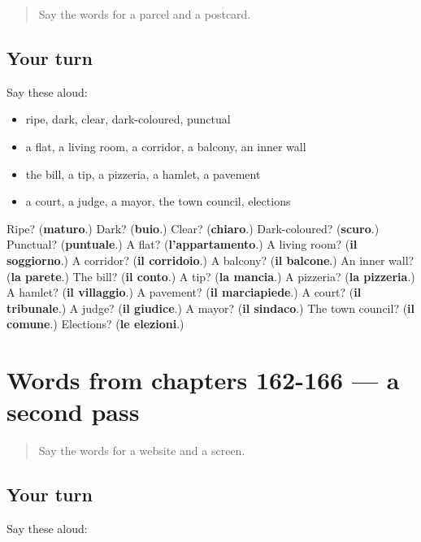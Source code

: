 \label{lesson:IT-R166-first-pass-words-from-chapters-158-161}



\begin{quote}
Say the words for a parcel and a postcard.
\end{quote}

\subsection*{Your turn}
Say these aloud:

\begin{itemize}
\raggedright
  \item ripe, dark, clear, dark-coloured, punctual
  \item a flat, a living room, a corridor, a balcony, an inner wall
  \item the bill, a tip, a pizzeria, a hamlet, a pavement
  \item a court, a judge, a mayor, the town council, elections
\end{itemize}

\begin{tcolorbox}[breakable,colback=teal!4,colframe=teal!35!black,title={Before you move on}]
Ripe? (\textbf{maturo}.) Dark? (\textbf{buio}.) Clear? (\textbf{chiaro}.) Dark-coloured? (\textbf{scuro}.) Punctual? (\textbf{puntuale}.) A flat? (\textbf{l'appartamento}.) A living room? (\textbf{il soggiorno}.) A corridor? (\textbf{il corridoio}.) A balcony? (\textbf{il balcone}.) An inner wall? (\textbf{la parete}.) The bill? (\textbf{il conto}.) A tip? (\textbf{la mancia}.) A pizzeria? (\textbf{la pizzeria}.) A hamlet? (\textbf{il villaggio}.) A pavement? (\textbf{il marciapiede}.) A court? (\textbf{il tribunale}.) A judge? (\textbf{il giudice}.) A mayor? (\textbf{il sindaco}.) The town council? (\textbf{il comune}.) Elections? (\textbf{le elezioni}.)
\end{tcolorbox}
\section[(dialogue)]{Words from chapters 162-166 — a second pass}

\label{lesson:IT-R166-second-pass-words-from-chapters-162-166}



\begin{quote}
Say the words for a website and a screen.
\end{quote}

\subsection*{Your turn}
Say these aloud:

